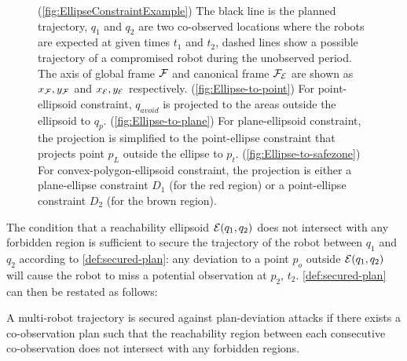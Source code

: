 \documentclass[10pt,twocolumn,twoside]{IEEEtran}
\begin{document}
\begin{figure}

    \caption{ (\ref{fig:EllipseConstraintExample}) The black line is the planned trajectory, $q_1$ and $q_2$ are two co-observed locations where the robots are expected at given times $t_1$ and $t_2$, dashed lines show a possible trajectory of a compromised robot during the unobserved period. The axis of global frame $\mathcal{F}$ and canonical frame $\mathcal{F}_{\mathcal{E}}$ are shown as $x_{\mathcal{F}}, y_{\mathcal{F}}$ and $x_{\mathcal{E}}, y_{\mathcal{E}}$ respectively. 
    (\ref{fig:Ellipse-to-point}) For point-ellipsoid constraint, $q_{avoid}$ is projected to the areas outside the ellipsoid to $q_{p}$. 
    (\ref{fig:Ellipse-to-plane}) For plane-ellipsoid constraint, the projection is simplified to the point-ellipse constraint that projects point $p_{L}$ outside the ellipse to $p_{t}$.
    (\ref{fig:Ellipse-to-safezone}) For convex-polygon-ellipsoid constraint, the projection is either a plane-ellipse constraint $D_{1}$ (for the red region) or a point-ellipse constraint $D_{2}$ (for the brown region).}
    \label{fig:Reachability_full}
  \end{figure}

  The condition that a reachability ellipsoid $\mathcal{E}(q_1,q_2)$ does not intersect with any forbidden region is sufficient to secure the trajectory of the robot between $q_1$ and $q_2$ according to \cref{def:secured-plan}: any deviation to a point $p_o$ outside $\mathcal{E}(q_1,q_2)$ will cause the robot to miss a potential observation at $p_2$, $t_2$. \cref{def:secured-plan} can then be restated as follows:
\begin{definition}\label{rmk:revised-security}
  A multi-robot trajectory is secured against plan-deviation attacks if there exists a co-observation plan such that the reachability region between each consecutive co-observation does not intersect with any forbidden regions.
\end{definition}
\end{document}
